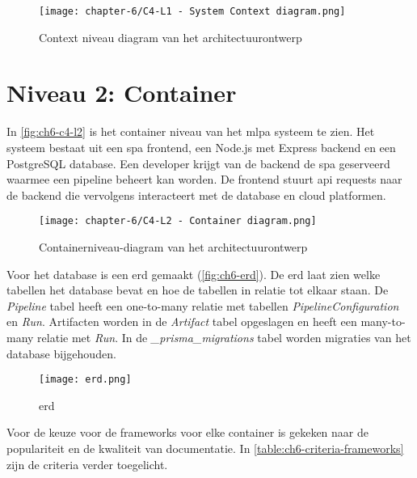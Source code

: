 \begin{figure}[hbt!]
  \centering
  \texttt{[image: chapter-6/C4-L1 - System Context diagram.png]}
  \caption{Context niveau diagram van het architectuurontwerp}
  \label{fig:ch6-c4-l1}
\end{figure}

\section{Niveau 2: Container}\label{sec:ch6-niveau-2-container}
In \autoref{fig:ch6-c4-l2} is het container niveau van het \Acrshort{mlpa} systeem te zien. Het systeem bestaat uit een \acrfull{spa} frontend, een Node.js met Express backend en een PostgreSQL database. Een developer krijgt van de backend de \Acrshort{spa} geserveerd waarmee een pipeline beheert kan worden. De frontend stuurt \Acrshort{api} requests naar de backend die vervolgens interacteert met de database en cloud platformen.

\newpage

\begin{figure}[hbt!]
  \centering
  \texttt{[image: chapter-6/C4-L2 - Container diagram.png]}
  \caption{Containerniveau-diagram van het architectuurontwerp}
  \label{fig:ch6-c4-l2}
\end{figure}

Voor het database is een \acrfull{erd} gemaakt (\autoref{fig:ch6-erd}). De \acrshort{erd} laat zien welke tabellen het database bevat en hoe de tabellen in relatie tot elkaar staan. De \textit{Pipeline} tabel heeft een one-to-many relatie met tabellen \textit{PipelineConfiguration} en \textit{Run}. Artifacten worden in de \textit{Artifact} tabel opgeslagen en heeft een many-to-many relatie met \textit{Run}. In de \textit{{\_}prisma{\_}migrations} tabel worden migraties van het database bijgehouden.

\begin{figure}[hbt!]
  \centering
  \texttt{[image: erd.png]}
  \caption{\Acrfull{erd}}
  \label{fig:ch6-erd}
\end{figure}

Voor de keuze voor de frameworks voor elke container is gekeken naar de populariteit en de kwaliteit van documentatie. In \autoref{table:ch6-criteria-frameworks} zijn de criteria verder toegelicht.

